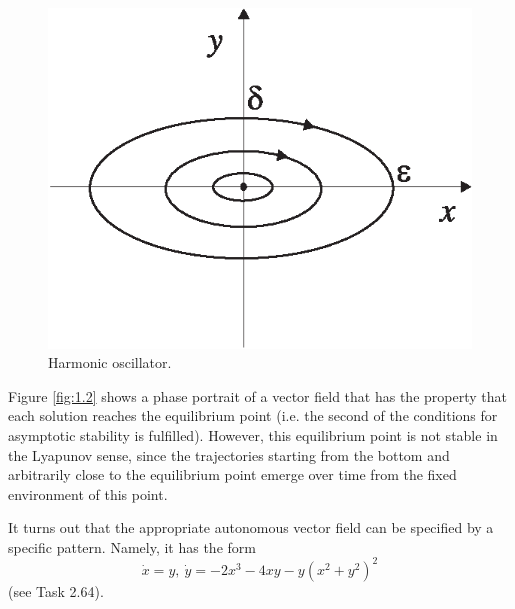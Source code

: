 \begin{figure}[!ht]
	\centering
	\includegraphics[scale=1.4]{jtr11}
	\caption{Harmonic oscillator.}
	\label{fig:1.1}
\end{figure}

\begin{example}
	Figure \ref{fig:1.2} shows a phase portrait of a vector field that has the property that each solution reaches the equilibrium point (i.e. the second of the conditions for asymptotic stability is fulfilled). However, this equilibrium point is not stable in the Lyapunov sense, since the trajectories starting from the bottom and arbitrarily close to the equilibrium point emerge over time from the fixed environment of this point.
	
	It turns out that the appropriate autonomous vector field can be specified by a specific pattern. Namely, it has the form
	\begin{equation}\label{1.2}
		\dot{x} = y, \ \dot{y} = -2x^3-4xy-y(x^2+y^2)^2
	\end{equation}
	(see Task 2.64).
\end{example}

